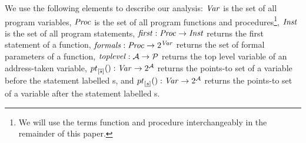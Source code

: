 We use the following elements to describe our analysis:
$\mathit{Var}$ is the set of all program variables,
$\mathit{Proc}$ is the set of all program functions and procedures\footnote{We
will use the terms function and procedure interchangeably in
the remainder of this paper.},
$\mathit{Inst}$ is the set of all program statements,
$\mathit{first}{}: \mathit{Proc} \rightarrow \mathit{Inst}$ returns the first
statement of a function,
$\mathit{formals}{}: \mathit{Proc} \rightarrow 2^{\mathit{Var}}$ returns the
set of formal parameters of a function, 
$\mathit{toplevel}{}: \mathcal{A} \rightarrow \mathcal{P}$ returns the top level
variable of an address-taken variable,
${pt}_{[\overline{s}] }(): \mathit{Var} \rightarrow 2^\mathcal{A}$ returns the
points-to set of a variable before the statement labelled s,
and ${pt}_{[\underline{s}]}(): \mathit{Var} \rightarrow 2^\mathcal{A}$ returns the
points-to set of a variable after the statement labelled s.
